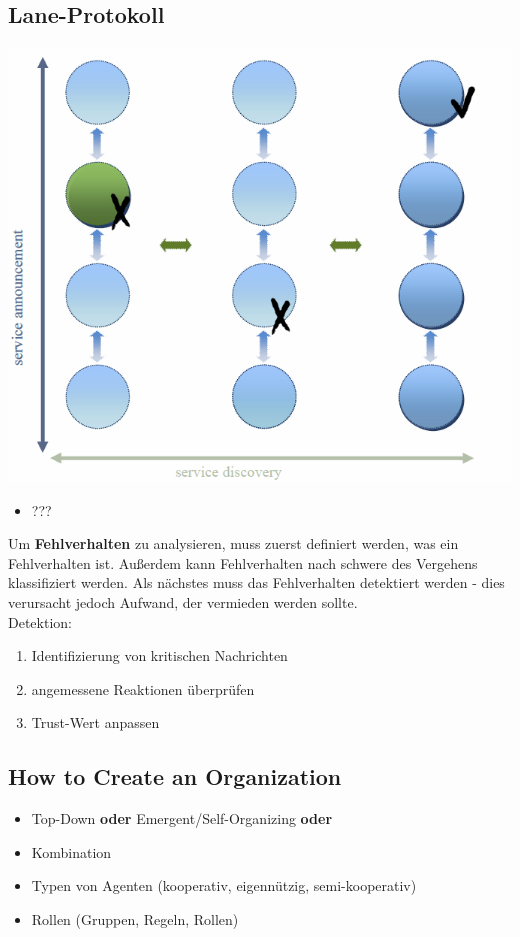 \documentclass{article} %
\begin{document}
	\subsection{Lane-Protokoll}
		\begin{center}
		\includegraphics[scale=0.5]{img/lane.png}
		\end{center}
		\begin{itemize}
		\item ???
		\end{itemize}
		Um \textbf{Fehlverhalten} zu analysieren, muss zuerst definiert werden, was ein Fehlverhalten ist. Außerdem kann Fehlverhalten nach schwere des Vergehens klassifiziert werden. Als nächstes muss das Fehlverhalten detektiert werden - dies verursacht jedoch Aufwand, der vermieden werden sollte.\\
		Detektion:
			\begin{enumerate}
			\item Identifizierung von kritischen Nachrichten
			\item angemessene Reaktionen überprüfen
			\item Trust-Wert anpassen
			\end{enumerate}
	\subsection{How to Create an Organization}
		\begin{itemize}
		\item Top-Down \textbf{oder} Emergent/Self-Organizing \textbf{oder} \item Kombination
		\item Typen von Agenten (kooperativ, eigennützig, semi-kooperativ)
		\item Rollen (Gruppen, Regeln, Rollen)
		\end{itemize}
\end{document}
